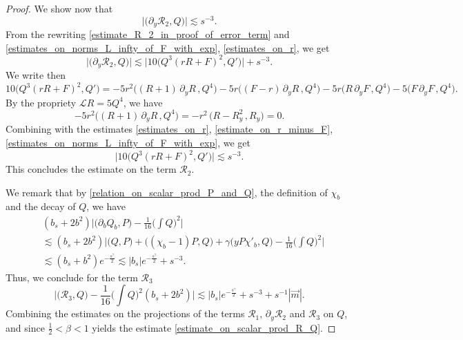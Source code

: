 \documentclass[16pt,english, oneside,reqno]{smfart}
\begin{document}
\begin{proof}
We show now that 
\begin{equation}
    \big\lvert \big( \partial_y \mathcal{R}_2, Q \big) \big\rvert \lesssim s^{-3}.
\end{equation}
From the rewriting \eqref{estimate_R_2_in_proof_of_error_term} and \eqref{estimates_on_norms_L_infty_of_F_with_exp}, \eqref{estimates_on_r}, we get
\begin{equation}
    \big\lvert \big( \partial_y \mathcal{R}_2, Q \big) \big\rvert \lesssim \big|10 \big( Q^3(rR+F)^2, Q' \big) \big| + s^{-3}.
\end{equation}
We write then
\begin{equation}
    10\big( Q^3(rR+F)^2, Q' \big) = -5r^2\big( (R+1)\,\partial_y R\,, Q^4 \big) -5r \big( (F-r)\,\partial_y R\,, Q^4 \big)-5r \big( R\, \partial_y F\,, Q^4 \big) - 5 \big( F\, \partial_y F\,, Q^4 \big).
\end{equation}
By the propriety $\mathcal{L}R = 5Q^4$, we have
\begin{equation}
    -5r^2 \big( (R+1)\,\partial_y R\, , Q^4 \big) = -r^2 \, \big( R - R^2_y\, , R_y \big) = 0.
\end{equation}
Combining with the estimates \eqref{estimates_on_r}, \eqref{estimate_on_r_minus_F}, \eqref{estimates_on_norms_L_infty_of_F_with_exp}, we get
\begin{equation}
    \big\lvert10\big( Q^3(rR+F)^2, Q' \big)\big\rvert \lesssim s^{-3}.
\end{equation}
This concludes the estimate on the term $\mathcal{R}_2$.

We remark that by \eqref{relation_on_scalar_prod_P_and_Q}, the definition of $\chi_b$ and the decay of $Q$, we have
\begin{equation}
\begin{split}
    & (b_s+2b^2) \bigg\lvert \big(\partial_bQ_b,P \big) -\frac{1}{16} \Big( \int Q\Big)^2 \bigg\rvert\\
    & \lesssim (b_s +2b^2)\bigg\lvert \big(Q,P\big) + \big((\chi_b-1)P,Q \big) + \gamma\big(  y P \chi'_b, Q\big) -\frac{1}{16} \Big( \int Q\Big)^2 \bigg\rvert\\
    & \lesssim (b_s + b^2)e^{-\frac{s^{\gamma}}{2}} \lesssim |b_s|e^{-\frac{s^{\gamma}}{2}} + s^{-3}.
\end{split}
\end{equation}
Thus, we conclude for the term $\mathcal{R}_3$
\begin{equation}
    \bigg\lvert \big( \mathcal{R}_3, Q \big) - \frac{1}{16}\Big(\int Q \Big)^2 (b_s + 2b^2) \bigg\rvert \lesssim  |b_s|e^{-\frac{s^{\gamma}}{2}}+ s^{-3} + s^{-1}|\vec{m}|.
\end{equation}
Combining the estimates on the projections of the terms $\mathcal{R}_1$,  $\partial_y\mathcal{R}_2$ and  $\mathcal{R}_3$ on $Q$, and since $\frac{1}{2}<\beta<1$ yields the estimate \eqref{estimate_on_scalar_prod_R_Q}.
\end{proof}
\end{document}
